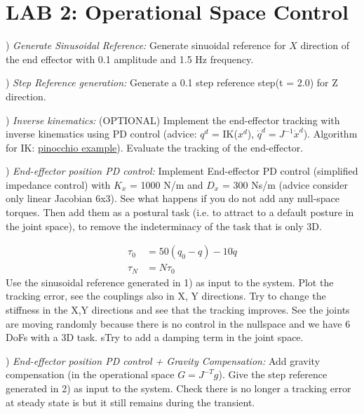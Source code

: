 \documentclass{report}
\begin{document}
\section*{LAB 2: Operational Space Control	}

\quad

) \textit{Generate Sinusoidal Reference:}
Generate sinuoidal reference for $X$ direction of the end effector with 0.1 amplitude and 1.5 Hz frequency.

\quad

) \textit{Step Reference generation:}
Generate a 0.1 step reference step(t = 2.0) for Z direction.

\quad

) \textit{Inverse kinematics:} (OPTIONAL) Implement the end-effector tracking with inverse kinematics using PD control (advice: $q^d$ = IK($x^d$), $\dot{q}^d =  J^{-1} \dot{x}^d$). Algorithm for IK: \href{https://gepettoweb.laas.fr/doc/stack-of-tasks/pinocchio/master/doxygen-html/md_doc_b-examples_i-inverse-kinematics.html}{pinocchio example}). Evaluate the tracking of the end-effector.

\quad

)\textit{ End-effector position  PD control:}
Implement End-effector PD control (simplified impedance control) with $K_x$ = 1000 N/m and $D_x$ = 300 Ns/m (advice consider only linear Jacobian 6x3). 
See what happens if you do not add any null-space torques. Then add them as a postural task (i.e. to attract to a default posture in the joint space), to remove the indeterminacy of the task that is only 3D.


\begin{align}
  \tau_0& = 50(q_0-q) - 10\dot{q}\\
\tau_N& = N \tau_0 
\label{fig:}
\end{align}
Use the sinusoidal reference generated in 1) as input to the system. Plot the tracking error, see the couplings also in X, Y directions. Try to change the stiffness in the X,Y directions and see that the tracking improves. See the joints are moving randomly because there is no control in the nullspace and we have 6 DoFs with a 3D task. sTry to add a damping term in the joint space.

\quad

) \textit{ End-effector position  PD control + Gravity Compensation:}
Add gravity compensation (in the operational space $G= J^{-T}g$). Give the step reference generated in 2) as input to the system. Check there is no longer a  tracking error at steady state is  but it still remains during the transient. 
\end{document}
